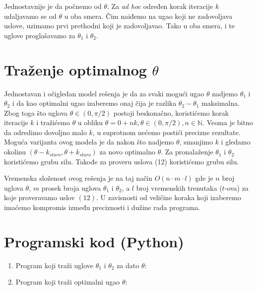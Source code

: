 \documentclass[a4paper, 12pt]{article}
\begin{document}

Jednostavnije je da počnemo od $\theta$. Za \textit{ad hoc} određen korak iteracije $k$ udaljavamo se od $\theta$ u oba smera. Čim naiđemo na ugao koji ne zadovoljava uslove, uzimamo prvi prethodni koji je zadovoljavao. Tako u oba smera, i te uglove proglašavamo za $\theta_1$ i $\theta_2$.



\section{Traženje optimalnog $\theta$}

Jednostavan i očigledan model rešenja je da za svaki mogući ugao $\theta$ nadjemo $\theta_1$ i $\theta_2$ i da kao optimalni ugao izaberemo onaj čija je razlika $\theta_2 - \theta_1$ maksimalna. Zbog toga što uglova $\theta \in (0,\pi/2)$ postoji beskonačno, koristićemo korak iteracije $k$ i tražićemo $\theta$ u obliku $ \theta = 0 + nk, \theta \in (0,\pi/2), n \in  \mathbb{N}$. Veoma je bitno da odredimo dovoljno malo $k$, u suprotnom nećemo postići precizne rezultate. Moguća varijanta ovog modela je da nakon što nadjemo $\theta$, smanjimo $k$ i gledamo okolinu $(\theta - k_{staro}, \theta + k_{staro})$ za novo optimalno $\theta$.
Za pronalaženje $\theta_1$ i $\theta_2$ koristićemo grubu silu. Takođe za proveru uslova (12) koristićemo grubu silu.

Vremenska složenost ovog rešenja je na taj način $O(n \cdot m \cdot l)$ gde je $n$ broj uglova $\theta$, $m$ prosek broja uglova $\theta_1$ i $\theta_2$, a $l$ broj vremenskih trenutaka ($t$-ova) za koje proveravamo uslov $(12)$. U zavisnosti od veličine koraka koji izaberemo imaćemo kompromis između preciznosti i dužine rada programa.

\pagebreak

\section{Programski kod (Python)}

\begin{enumerate}

\item Program koji traži uglove $\theta_1$ i $\theta_2$ za dato $\theta$:



\item Program koji traži optimalni ugao $\theta$:



\end{enumerate}
\end{document}
